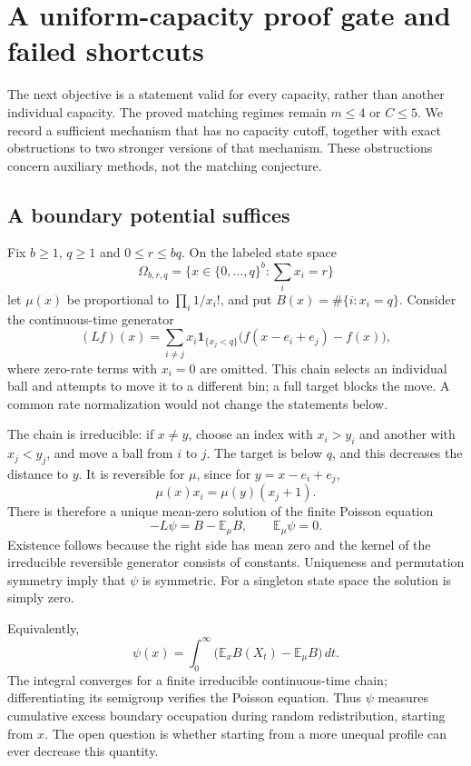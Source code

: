 \documentclass[11pt]{article}
\begin{document}
\section{A uniform-capacity proof gate and failed shortcuts}\label{sec:uniformgate}
The next objective is a statement valid for every capacity, rather
than another individual capacity. The proved matching regimes remain
$m\leq4$ or $C\leq5$. We record a sufficient mechanism that has no
capacity cutoff, together with exact obstructions to two stronger
versions of that mechanism. These obstructions concern auxiliary
methods, not the matching conjecture.

\subsection{A boundary potential suffices}
Fix $b\geq1$, $q\geq1$ and $0\leq r\leq bq$. On the labeled state space
\[
 \Omega_{b,r,q}=\{x\in\{0,\ldots,q\}^b:\textstyle\sum_i x_i=r\}
\]
let $\mu(x)$ be proportional to $\prod_i1/x_i!$, and put
$B(x)=\#\{i:x_i=q\}$. Consider the continuous-time generator
\begin{equation}\label{eq:urngenerator}
 (Lf)(x)=\sum_{i\ne j}x_i\mathbf1_{\{x_j<q\}}
       \bigl(f(x-e_i+e_j)-f(x)\bigr),
\end{equation}
where zero-rate terms with $x_i=0$ are omitted. This chain selects
an individual ball and attempts to move it to a different bin;
a full target blocks the move. A common rate normalization would
not change the statements below.

The chain is irreducible: if $x\ne y$, choose an index with
$x_i>y_i$ and another with $x_j<y_j$, and move a ball from $i$ to $j$.
The target is below $q$, and this decreases the distance to $y$.
It is reversible for $\mu$, since for $y=x-e_i+e_j$,
\[
 \mu(x)x_i=\mu(y)(x_j+1).
\]
There is therefore a unique mean-zero solution of the finite Poisson
equation
\begin{equation}\label{eq:boundarypoisson}
 -L\psi=B-\mathbb E_\mu B,\qquad \mathbb E_\mu\psi=0.
\end{equation}
Existence follows because the right side has mean zero and the kernel
of the irreducible reversible generator consists of constants.
Uniqueness and permutation symmetry imply that $\psi$ is symmetric.
For a singleton state space the solution is simply zero.

Equivalently,
\[
 \psi(x)=\int_0^\infty
       \bigl(\mathbb E_x B(X_t)-\mathbb E_\mu B\bigr)\,dt.
\]
The integral converges for a finite irreducible continuous-time chain;
differentiating its semigroup verifies the Poisson equation.
Thus $\psi$ measures cumulative excess boundary occupation during
random redistribution, starting from $x$. The open question is whether
starting from a more unequal profile can ever decrease this quantity.
\end{document}
